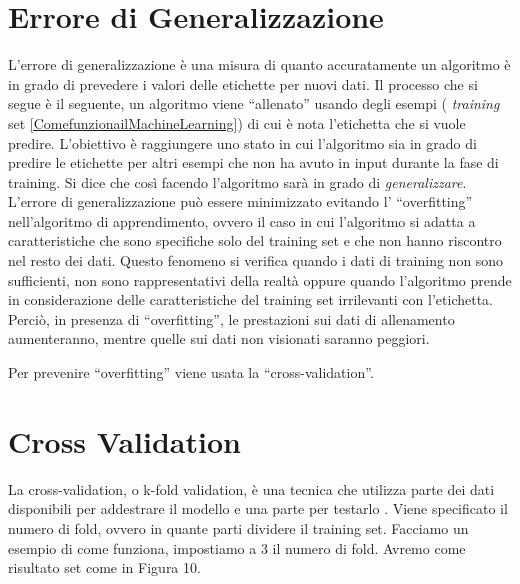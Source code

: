 \documentclass[12pt,italian]{report}
\begin{document}
\section{Errore di Generalizzazione}
\label{sec:errore}
L'errore di generalizzazione è una misura di quanto accuratamente un algoritmo è in grado di prevedere i valori delle etichette per nuovi dati.
Il processo che si segue è il seguente, un algoritmo viene ``allenato'' usando degli esempi ( \emph{training} set \ref{ComefunzionailMachineLearning}) di cui è nota l'etichetta che si vuole predire. L'obiettivo è raggiungere uno stato in cui l'algoritmo sia in grado di predire le etichette per altri esempi che non ha avuto in input durante la fase di training. Si dice che così facendo l'algoritmo sarà in grado di \emph{generalizzare}.
L'errore di generalizzazione può essere  minimizzato evitando l' ``overfitting'' nell'algoritmo di apprendimento, ovvero il caso in cui l'algoritmo si adatta a caratteristiche che sono specifiche solo del training set e che non hanno riscontro nel resto dei dati. Questo fenomeno si verifica quando i dati di training non sono sufficienti, non sono rappresentativi della realtà oppure quando l'algoritmo prende in considerazione delle caratteristiche del training set irrilevanti con l'etichetta.  Perciò, in presenza di ``overfitting'', le prestazioni sui dati di allenamento aumenteranno, mentre quelle sui dati non visionati saranno peggiori. 

Per prevenire ``overfitting'' viene usata la ``cross-validation''.
\section{Cross Validation}
\label{cv}
La cross-validation, o k-fold validation, è una tecnica che utilizza parte dei dati disponibili per addestrare il modello e una parte per testarlo \cite{TheElementsofStatisticalLearning}. Viene specificato il numero di fold, ovvero in quante parti dividere il training set. Facciamo un esempio di come funziona, impostiamo a 3 il numero di fold.	Avremo come risultato set come in Figura 10.
\end{document}
